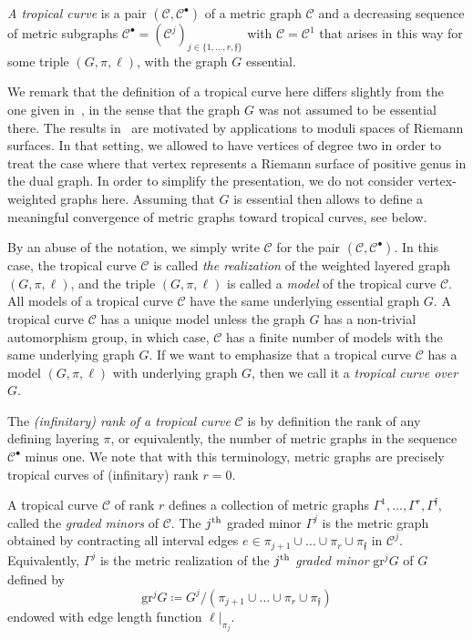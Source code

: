 \documentclass[AHL,Unicode,longabstracts]{cedram}
\newcommand{\rest}[1]{\vert_{#1}}
\newcommand{\curve}{\mathcal{C}}
\newcommand{\grm}[2]{\mathrm{gr}_{#1}^{#2}}
\newcommand{\fin}{\mathfrak f}
\begin{document}
\emph{A tropical curve} is a pair $(\curve, \curve^\bullet)$ of a metric graph $\curve$ and a decreasing sequence of metric subgraphs $\curve^\bullet = (\curve^j)_{j \in \{1, \dots, r, \fin\}}$ with $\curve = \curve^1$ that arises in this way for some triple $(G, \pi, \ell)$, with the graph $G$ essential.

\begin{rema}
We remark that the definition of a tropical curve here differs slightly from the one given in~\cite{AN2}, in the sense that the graph $G$ was not assumed to be essential there. The results in~\cite{AN2} are motivated by applications to moduli spaces of Riemann surfaces. In that setting, we allowed to have vertices of degree two in order to treat the case where that vertex represents a Riemann surface of positive genus in the dual graph. In order to simplify the presentation, we do not consider vertex-weighted graphs here. Assuming that $G$ is essential then allows to define a meaningful convergence of metric graphs toward tropical curves, see below.%
\end{rema}

By an abuse of the notation, we simply write $\curve$ for the pair $(\curve, \curve^\bullet)$. In this case, the tropical curve $\curve$ is called \emph{the realization} of the weighted layered graph $(G, \pi, \ell)$, and the triple $(G, \pi, \ell)$ is called a \emph{model} of the tropical curve $\curve$. All models of a tropical curve $\curve$ have the same underlying essential graph $G$. A tropical curve $\curve$ has a unique model unless the graph $G$ has a non-trivial automorphism group, in which case, $\curve$ has a finite number of models with the same underlying graph $G$. If we want to emphasize that a tropical curve $\curve$ has a model $(G,\pi, \ell)$ with underlying graph $G$, then we call it a \emph{tropical curve over $G$}.



The \emph{(infinitary) rank of a tropical curve} $\curve$ is by definition the rank of any defining layering $\pi$, or equivalently, the number of metric graphs in the sequence $\curve^\bullet$ minus one. We note that with this terminology, metric graphs are precisely tropical curves of (infinitary) rank $r = 0$.



A tropical curve $\curve$ of rank $r$ defines a collection of metric graphs $\Gamma^1, \dots, \Gamma^r, \Gamma^\fin$, called the \emph{graded minors} of $\curve$. The $j^{\rm th}$ graded minor $\Gamma^j$ is the metric graph obtained by contracting all interval edges $e \in \pi_{j+1}\cup\dots \cup \pi_{r} \cup \pi_\fin$ in $\curve^ j$. Equivalently, $\Gamma^j$ is the metric realization of the $j^{\rm th}$ \emph{graded minor} $\grm{}{j} G$ of $G$ defined by
\begin{equation*}
\grm{}{j} G\coloneqq G^j / \left(\pi_{j+1} \cup\dots \cup \pi_{r} \cup \pi_\fin\right)
\end{equation*}
endowed with edge length function $\ell\rest{\pi_{j}}$.
\end{document}

